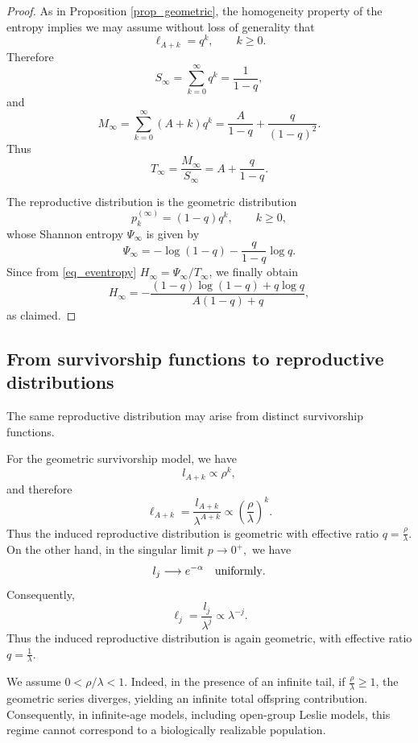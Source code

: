 \documentclass[10pt,a4paper]{amsart}
\theoremstyle{definition}
\theoremstyle{remark}
\numberwithin{equation}{section}
\begin{document}
\begin{proof}
	As in Proposition \ref{prop_geometric},  the homogeneity property of the entropy implies we may assume without loss of generality that 
\[
\ell_{A+k}
=
q^k,
\qquad
k\ge0.
\]
Therefore
\[
S_\infty
=
\sum_{k=0}^{\infty}q^k
=
\frac1{1-q},
\]
and
\[
M_\infty
=
\sum_{k=0}^{\infty}(A+k)q^k
=
\frac{A}{1-q}
+
\frac{q}{(1-q)^2}.
\]
Thus
\[
T_\infty
=
\frac{M_\infty}{S_\infty}
=
A+\frac{q}{1-q}.
\]

\noindent The reproductive distribution is the geometric
distribution
\[
p_k^{(\infty)}
=
(1-q)q^k,
\qquad
k\ge0, 
\]
whose Shannon entropy $\Psi_\infty$ is given by
\[
\Psi_\infty
=
-\log(1-q)
-
\frac{q}{1-q}\log q.
\]
Since from \eqref{eq_eventropy} \(H_\infty=\Psi_\infty/T_\infty\), we finally obtain
\[
H_\infty
=
-\frac{
(1-q)\log(1-q)
+
q\log q
}{
A(1-q)+q
},
\]
as claimed.
\end{proof}





\subsection{From survivorship functions to reproductive distributions}

The same reproductive distribution may arise from distinct survivorship functions.

For the geometric survivorship model, we have
\[
l_{A+k}\propto \rho^k,
\]
and therefore
\[
\ell_{A+k}
=
\frac{l_{A+k}}{\lambda^{A+k}}
\propto
\left(
\frac{\rho}{\lambda}
\right)^k.
\]
Thus the induced reproductive distribution is geometric with effective ratio
${\displaystyle q=\frac{\rho}{\lambda}.} $
On the other hand, in the singular limit
$
p\to0^+,
$
we have
\[
l_j\longrightarrow e^{-\alpha} \quad {\rm uniformly}.
\]
Consequently,
\[
\ell_j
=
\frac{l_j}{\lambda^j}
\propto
\lambda^{-j}.
\]
Thus the induced reproductive distribution is again geometric, with effective ratio $
q=\frac1\lambda$.

We assume $
0<\rho/\lambda<1$.
Indeed, in the presence of an infinite tail, if $
\frac{\rho}{\lambda}\ge 1$,
the geometric series diverges, yielding an infinite total offspring contribution. Consequently, in infinite-age models, including open-group Leslie models, this regime cannot correspond to a biologically realizable population.
\end{document}

